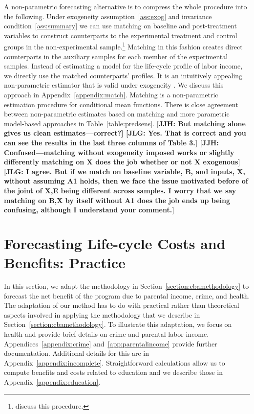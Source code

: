 A non-parametric forecasting alternative is to compress the whole procedure into the following. Under exogeneity assumption~\ref{ass:exog} and invariance condition~\ref{ass:summary} we can use matching on baseline and post-treatment variables to construct counterparts to the experimental treatment and control groups in the non-experimental sample.\footnote{\citet{Heckman_Ichimura_etal_1998_Econometrica} discuss this procedure.} Matching in this fashion creates direct counterparts in the auxiliary samples for each member of the experimental samples. Instead of estimating a model for the life-cycle profile of labor income, we directly use the matched counterparts' profiles. It is an intuitively appealing non-parametric estimator that is valid under exogeneity \citep{Heckman_Navarro_2004_REStat}. We discuss this approach in Appendix~\ref{appendix:match}. Matching is a non-parametric estimation procedure for conditional mean functions. There is close agreement between non-parametric estimates based on matching and more parametric model-based approaches in Table~\ref{table:predsens}. \textbf{[JJH: But matching alone gives us clean estimates---correct?] [JLG: Yes. That is correct and you can see the results in the last three columns of Table 3.] [JJH: Confused---matching without exogeneity imposed works or slightly differently matching on X does the job whether or not X exogenous] [JLG: I agree. But if we match on baseline variable, B, and inputs, X,  without assuming A1 holds, then we face the issue motivated before of the joint of X,E being different across samples. I worry that we say matching on B,X by itself without A1 does the job ends up being confusing, although I understand your comment.] }

\section{Forecasting Life-cycle Costs and Benefits: Practice} \label{section:cbapractice}

In this section, we adapt the methodology in Section~\ref{section:cbamethodology} to forecast the net benefit of the program due to parental income, crime, and health. The adaptation of our method has to do with practical rather than theoretical aspects involved in applying the methodology that we describe in Section~\ref{section:cbamethodology}. To illustrate this adaptation, we focus on health and provide brief details on crime and parental labor income. Appendices~\ref{appendix:crime} and~\ref{app:parentalincome} provide further documentation. Additional details for this are in Appendix~\ref{appendix:incomplete}. Straightforward calculations allow us to compute benefits and costs related to education and we describe those in Appendix~\ref{appendix:education}.

